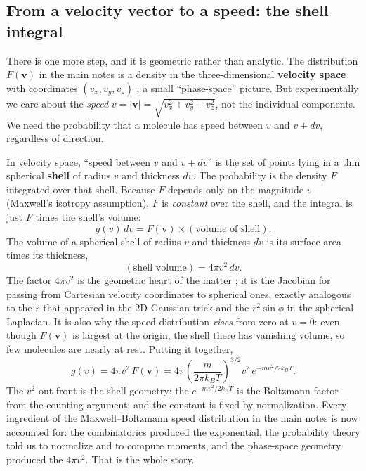 \documentclass{report}
\numberwithin{equation}{section}
\begin{document}
\subsection{From a velocity vector to a speed: the shell integral}
There is one more step, and it is geometric rather than analytic. The distribution $F(\mathbf v)$ in the main notes is a density in the three-dimensional \textbf{velocity space} with coordinates $(v_x,v_y,v_z)$ ; a small ``phase-space'' picture. But experimentally we care about the \emph{speed} $v = |\mathbf v| = \sqrt{v_x^2+v_y^2+v_z^2}$, not the individual components. We need the probability that a molecule has speed between $v$ and $v+dv$, regardless of direction.

In velocity space, ``speed between $v$ and $v+dv$'' is the set of points lying in a thin spherical \textbf{shell} of radius $v$ and thickness $dv$. The probability is the density $F$ integrated over that shell. Because $F$ depends only on the magnitude $v$ (Maxwell's isotropy assumption), $F$ is \emph{constant} over the shell, and the integral is just $F$ times the shell's volume:
\begin{equation}
	g(v)\,dv = F(\mathbf v)\times(\text{volume of shell}).
\end{equation}
The volume of a spherical shell of radius $v$ and thickness $dv$ is its surface area times its thickness,
\begin{equation}
	(\text{shell volume}) = 4\pi v^2\,dv.
\end{equation}
The factor $4\pi v^2$ is the geometric heart of the matter ; it is the Jacobian for passing from Cartesian velocity coordinates to spherical ones, exactly analogous to the $r$ that appeared in the 2D Gaussian trick and the $r^2\sin\phi$ in the spherical Laplacian. It is also why the speed distribution \emph{rises} from zero at $v=0$: even though $F(\mathbf v)$ is largest at the origin, the shell there has vanishing volume, so few molecules are nearly at rest. Putting it together,
\begin{equation}
	g(v) = 4\pi v^2\,F(\mathbf v) = 4\pi\left(\frac{m}{2\pi k_BT}\right)^{3/2} v^2\,e^{-mv^2/2k_BT}.
\end{equation}
The $v^2$ out front is the shell geometry; the $e^{-mv^2/2k_BT}$ is the Boltzmann factor from the counting argument; and the constant is fixed by normalization. Every ingredient of the Maxwell--Boltzmann speed distribution in the main notes is now accounted for: the combinatorics produced the exponential, the probability theory told us to normalize and to compute moments, and the phase-space geometry produced the $4\pi v^2$. That is the whole story.
\end{document}
